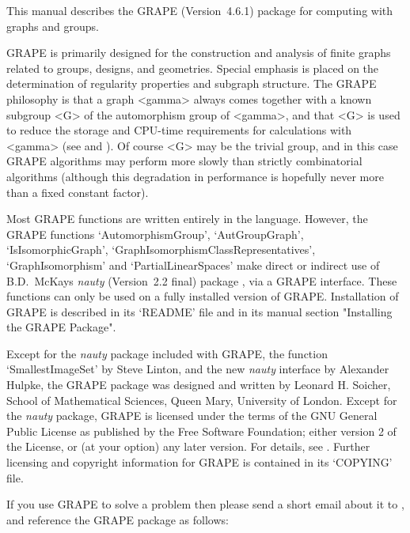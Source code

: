 %
%
%
%
\def\GRAPE{\sf GRAPE}
\def\nauty{\it nauty}
\def\Aut{{\rm Aut}\,} 


This manual describes the {\GRAPE} (Version~4.6.1) package for computing
with graphs and groups.

{\GRAPE} is primarily designed for the construction and analysis of
finite graphs related to groups, designs, and geometries. Special
emphasis is placed on the determination of regularity properties and
subgraph structure. The {\GRAPE} philosophy is that a graph <gamma>
always comes together with a known subgroup <G> of the automorphism
group of <gamma>, and that <G> is used to reduce the storage and
CPU-time requirements for calculations with <gamma> (see
\cite{Soi93} and \cite{Soi04}).  Of course <G> may be the trivial group,
and in this case {\GRAPE} algorithms may perform more slowly than strictly
combinatorial algorithms (although this degradation in performance is
hopefully never more than a fixed constant factor).

Most {\GRAPE} functions are written entirely in the {\GAP} language.
However, the {\GRAPE} functions `AutomorphismGroup', `AutGroupGraph',
`IsIsomorphicGraph', `GraphIsomorphismClassRepresentatives',
`GraphIsomorphism'  and `PartialLinearSpaces' make direct or indirect use
of B.D.~McKay{\pif}s {\nauty} (Version~2.2 final) package \cite{Nau90},
via a {\GRAPE} interface.  These functions can only be used on a fully
installed version of {\GRAPE}. Installation of {\GRAPE} is described
in its `README' file and in its manual section "Installing the GRAPE
Package". 

Except for the {\nauty} package included with {\GRAPE}, the function
`SmallestImageSet' by Steve Linton, and the new {\nauty} interface by
Alexander Hulpke, the {\GRAPE} package was designed and written by Leonard
H. Soicher, School of Mathematical Sciences, Queen Mary, University of
London.  Except for the {\nauty} package, {\GRAPE} is licensed under the
terms of the GNU General Public License as published by the Free Software
Foundation; either version 2 of the License, or (at your option) any later
version. For details, see .
Further licensing and copyright information for {\GRAPE} is contained 
in its `COPYING' file. 

If you use {\GRAPE} to solve a problem then please send a short email
about it to , and reference the {\GRAPE} 
package as follows:

